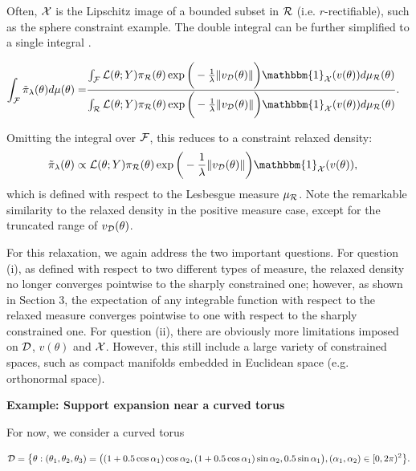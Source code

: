 \documentclass[10pt,fleqn]{article}
\DeclareMathOperator{\1}{\mathbbm{1}} \DeclareMathOperator{\bigO}{\mc O}
\begin{document}
Often, $\mathcal{X}$ is the Lipschitz image of a bounded subset in $\mathcal{R}$ (i.e. $r$-rectifiable), such as the sphere constraint example. The double integral  can be further simplified to a single integral \citep{federer2014geometric}.


\begin{equation}
\begin{aligned}
\int_{\mc F} \tilde{\pi}_\lambda(\theta) d \mu(\theta) 
= & \frac{\int_\mathcal{F} \mathcal{L}(\theta;Y)
\pi_\mathcal{R}(\theta)\exp\bigg(-\frac{1}{\lambda}\|v_\mathcal{D}(\theta)\|\bigg)
\mathbbm{1}_{\mc X}(v(\theta)) d\mu_\mathcal{R}(\theta)}
{\int_\mathcal{R} \mathcal{L}(\theta;Y)
\pi_\mathcal{R}(\theta)\exp\bigg(-\frac{1}{\lambda}\|v_\mathcal{D}(\theta)\|\bigg)
\mathbbm{1}_{\mc X}(v(\theta)) d\mu_\mathcal{R}(\theta)}.
\end{aligned}
\end{equation}

Omitting the integral over
$\mathcal{F}$, this reduces to a constraint relaxed density:
\begin{equation}
\begin{split}
\label{EQ:relaxedDensityZeroMeasure}
\tilde{\pi}_\lambda(\theta)  & \propto \mathcal{L}(\theta;Y)
\pi_\mathcal{R}(\theta)\exp\bigg(-\frac{1}{\lambda}\|v_\mathcal{D}(\theta)\|\bigg)
\mathbbm{1}_{\mc X}(v(\theta)),
\end{split}
\end{equation}
which is defined with respect to the Lesbesgue measure $\mu_{\mathcal{R}}$. Note the remarkable similarity to the relaxed density in the positive measure case, except for the truncated range of  $v_{\mathcal{D}}(\theta)$.

For this relaxation, we again address the two important questions. For question (i), as defined with respect to two different types of measure, the relaxed density no longer converges pointwise to the sharply constrained one; however, as shown in Section 3, the expectation of any integrable function with respect to the relaxed measure converges pointwise to one with respect to the sharply constrained one. For question (ii), there are obviously more limitations imposed on $\mathcal{D}$, $v(\theta)$ and $\mathcal{X}$. However, this still include a large variety of constrained spaces, such as compact manifolds embedded in Euclidean space (e.g. orthonormal space).

\textbf{Example: Support expansion near a curved torus}


For now, we consider a curved torus

$$\mathcal{D}= \big\{\theta: (\theta_1,\theta_2,\theta_3) = \big(
(1+ 0.5 \cos\alpha_1) \cos\alpha_2, (1+ 0.5\cos\alpha_1) \sin\alpha_2,0.5 \sin\alpha_1\big), (\alpha_1,\alpha_2)\in [0,2\pi)^2 \big\}.$$ 
\end{document}
